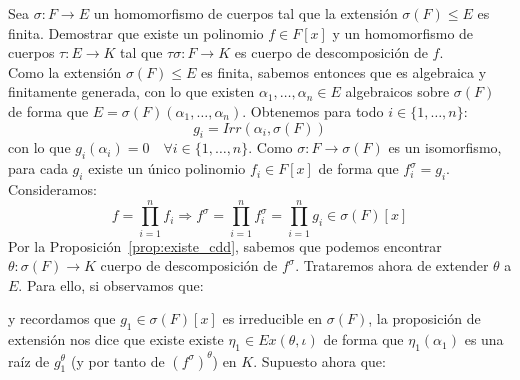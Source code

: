 \begin{ejercicio}
    Sea $\sigma:F\to E$ un homomorfismo de cuerpos tal que la extensión $\sigma(F)\leq E$ es finita. Demostrar que existe un polinomio $f\in F[x]$ y un homomorfismo de cuerpos $\tau:E\to K$ tal que $\tau\sigma:F\to K$ es cuerpo de descomposición de $f$.\\

    \noindent
    Como la extensión $\sigma(F)\leq E$ es finita, sabemos entonces que es algebraica y finitamente generada, con lo que existen $\alpha_1, \ldots, \alpha_n\in E$ algebraicos sobre $\sigma(F)$ de forma que $E = \sigma(F)(\alpha_1, \ldots, \alpha_n)$. Obtenemos para todo $i \in \{1,\ldots,n\}$:
    \begin{equation*}
        g_i = Irr(\alpha_i, \sigma(F))
    \end{equation*}
    con lo que $g_i(\alpha_i)=0\quad \forall i \in \{1,\ldots,n\}$. Como $\sigma:F\to\sigma(F)$ es un isomorfismo, para cada $g_i$ existe un único polinomio $f_i \in F[x]$ de forma que $f_i^\sigma=g_i$. Consideramos:
    \begin{equation*}
        f = \prod_{i=1}^{n} f_i \Longrightarrow f^\sigma =\prod_{i=1}^{n}f_i^\sigma= \prod_{i=1}^{n}g_i \in \sigma(F)[x]
    \end{equation*}
    Por la Proposición~\ref{prop:existe_cdd}, sabemos que podemos encontrar $\theta:\sigma(F)\to K$ cuerpo de descomposición de $f^{\sigma}$. Trataremos ahora de extender $\theta$ a $E$. Para ello, si observamos que:
    \begin{figure}[H]
        \centering
    \end{figure}
    \noindent
    y recordamos que $g_1\in \sigma(F)[x]$ es irreducible en $\sigma(F)$, la proposición de extensión nos dice que existe existe $\eta_1 \in Ex(\theta,\iota)$ de forma que $\eta_1(\alpha_1)$ es una raíz de $g_1^\theta$ (y por tanto de ${(f^\sigma)}^{\theta}$) en $K$. Supuesto ahora que:
    \begin{figure}[H]
        \centering
\end{figure}
\end{ejercicio}
